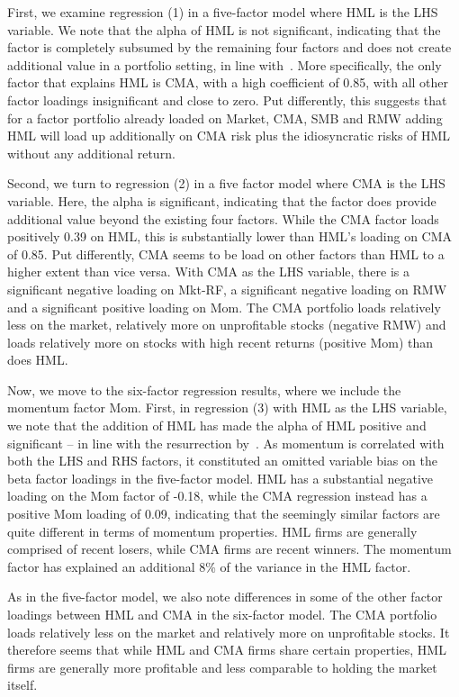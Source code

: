 First, we examine regression (1) in a five-factor model where HML is the LHS variable. We note that the alpha of HML is not significant, indicating that the factor is completely subsumed by the remaining four factors and does not create additional value in a portfolio setting, in line with~\textcite{FF2015}. More specifically, the only factor that explains HML is CMA, with a high coefficient of 0.85, with all other factor loadings insignificant and close to zero. Put differently, this suggests that for a factor portfolio already loaded on Market, CMA, SMB and RMW adding HML will load up additionally on CMA risk plus the idiosyncratic risks of HML without any additional return.

Second, we turn to regression (2) in a five factor model where CMA is the LHS variable. Here, the alpha is significant, indicating that the factor does provide additional value beyond the existing four factors. While the CMA factor loads positively 0.39 on HML, this is substantially lower than HML's loading on CMA of 0.85. Put differently, CMA seems to be load on other factors than HML to a higher extent than vice versa. With CMA as the LHS variable, there is a significant negative loading on Mkt-RF, a significant negative loading on RMW and a significant positive loading on Mom. The CMA portfolio loads relatively less on the market, relatively more on unprofitable stocks (negative RMW) and loads relatively more on stocks with high recent returns (positive Mom) than does HML.



Now, we move to the six-factor regression results, where we include the momentum factor Mom. First, in regression (3) with HML as the LHS variable, we note that the addition of HML has made the alpha of HML positive and significant -- in line with the resurrection by~\textcite{Asness2015}. As momentum is correlated with both the LHS and RHS factors, it constituted an omitted variable bias on the beta factor loadings in the five-factor model. HML has a substantial negative loading on the Mom factor of -0.18, while the CMA regression instead has a positive Mom loading of 0.09, indicating that the seemingly similar factors are quite different in terms of momentum properties. HML firms are generally comprised of recent losers, while CMA firms are recent winners. The momentum factor has explained an additional 8\% of the variance in the HML factor.

As in the five-factor model, we also note differences in some of the other factor loadings between HML and CMA in the six-factor model. The CMA portfolio loads relatively less on the market and relatively more on unprofitable stocks. It therefore seems that while HML and CMA firms share certain properties, HML firms are generally more profitable and less comparable to holding the market itself.

